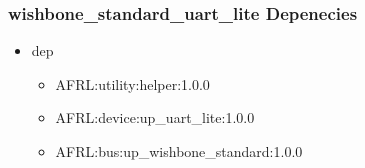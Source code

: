 \subsubsection{wishbone\_standard\_uart\_lite Depenecies}
\begin{itemize}
\item dep
	\begin{itemize}
	\item AFRL:utility:helper:1.0.0
	\item AFRL:device:up\_uart\_lite:1.0.0
	\item AFRL:bus:up\_wishbone\_standard:1.0.0
	\end{itemize}
\end{itemize}
